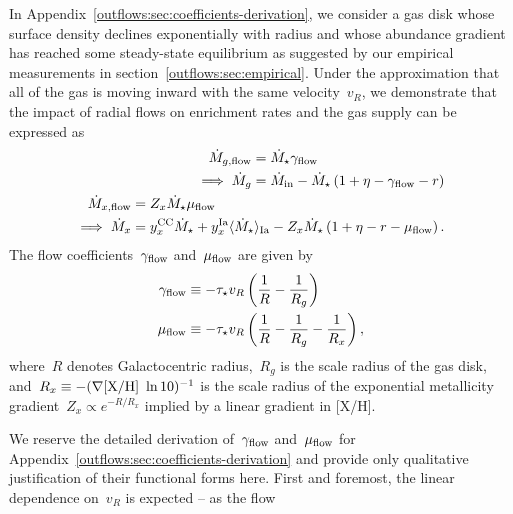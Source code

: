 In Appendix~\ref{outflows:sec:coefficients-derivation}, we consider a gas disk
whose surface density declines exponentially with radius and whose abundance
gradient has reached some steady-state equilibrium as suggested by our
empirical measurements in section~\ref{outflows:sec:empirical}.
Under the approximation that all of the gas is moving inward with the same
velocity~$v_R$, we demonstrate that the impact of radial flows on enrichment
rates and the gas supply can be expressed as
\begin{subequations}\begin{align}
\begin{split}
\dot{M}_{g,\text{flow}} &= \dot{M}_\star \gamma_{\text{flow}}
\\
\implies \dot{M}_g &= \dot{M}_\text{in} - \dot{M}_\star
\left(1 + \eta - \gamma_{\text{flow}} - r\right)
\label{outflows:eq:mdot-gas-flow}
\end{split}
\\
\begin{split}
\dot{M}_{x,\text{flow}} &= Z_x \dot{M}_\star \mu_{\text{flow}}
\\
\implies \dot{M}_x &= y_\text{$x$}^\text{CC} \dot{M}_\star +
y_\text{$x$}^\text{Ia} \langle \dot{M}_\star \rangle_\text{Ia} -
Z_x \dot{M}_\star \left(1 + \eta - r - \mu_{\text{flow}}\right).
\label{outflows:eq:mdot-element-flow}
\end{split}
\end{align}\end{subequations}
The flow coefficients~$\gamma_{\text{flow}}$ and~$\mu_{\text{flow}}$ are given by
\begin{subequations}\begin{align}
\gamma_{\text{flow}} &\equiv -\tau_\star v_R
\left(\frac{1}{R} - \frac{1}{R_g}\right)
\label{outflows:eq:gamma-flow}
\\
\mu_{\text{flow}} &\equiv -\tau_\star v_R
\left(\frac{1}{R} - \frac{1}{R_g} - \frac{1}{R_x}\right),
\label{outflows:eq:mu-flow}
\end{align}\end{subequations}
where~$R$ denotes Galactocentric radius,~$R_g$ is the scale radius of the gas
disk, and~$R_x \equiv -(\nabla\text{[X/H]}~\ln 10)^{-1}$ is the scale radius of the
exponential metallicity gradient~$Z_x \propto e^{-R / R_x}$ implied by a linear
gradient in [X/H].
\par
We reserve the detailed derivation of~$\gamma_{\text{flow}}$ and~$\mu_{\text{flow}}$ for
Appendix~\ref{outflows:sec:coefficients-derivation} and provide only
qualitative justification of their functional forms here.
First and foremost, the linear dependence on~$v_R$ is expected -- as the flow
